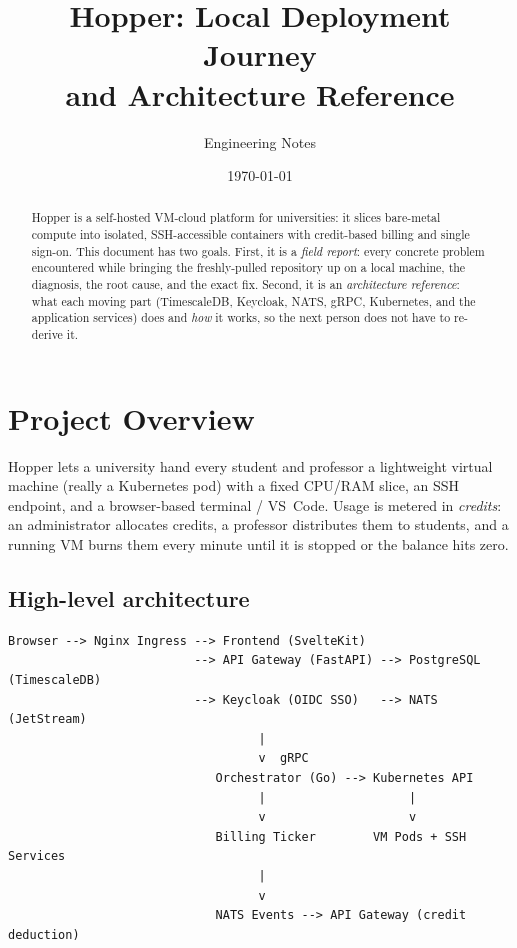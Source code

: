 \documentclass[11pt,a4paper]{article}
\title{\textbf{Hopper: Local Deployment Journey \\ and Architecture Reference}}
\author{Engineering Notes}
\date{\today}
\begin{document}
\maketitle
\thispagestyle{empty}

\begin{abstract}
\noindent
Hopper is a self-hosted VM-cloud platform for universities: it slices bare-metal
compute into isolated, SSH-accessible containers with credit-based billing and
single sign-on. This document has two goals. First, it is a \emph{field report}:
every concrete problem encountered while bringing the freshly-pulled repository up
on a local machine, the diagnosis, the root cause, and the exact fix. Second, it
is an \emph{architecture reference}: what each moving part (TimescaleDB, Keycloak,
NATS, gRPC, Kubernetes, and the application services) does and \emph{how} it works,
so the next person does not have to re-derive it.
\end{abstract}

\tableofcontents
\newpage

\section{Project Overview}

Hopper lets a university hand every student and professor a lightweight virtual
machine (really a Kubernetes pod) with a fixed CPU/RAM slice, an SSH endpoint, and
a browser-based terminal / VS~Code. Usage is metered in \emph{credits}: an
administrator allocates credits, a professor distributes them to students, and a
running VM burns them every minute until it is stopped or the balance hits zero.

\subsection{High-level architecture}

\begin{lstlisting}
Browser --> Nginx Ingress --> Frontend (SvelteKit)
                          --> API Gateway (FastAPI) --> PostgreSQL (TimescaleDB)
                          --> Keycloak (OIDC SSO)   --> NATS (JetStream)
                                   |
                                   v  gRPC
                             Orchestrator (Go) --> Kubernetes API
                                   |                    |
                                   v                    v
                             Billing Ticker        VM Pods + SSH Services
                                   |
                                   v
                             NATS Events --> API Gateway (credit deduction)
\end{lstlisting}
\end{document}
